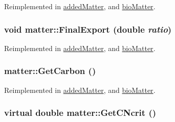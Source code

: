 Reimplemented in \hyperlink{classadded_matter_a40c4a27c09387b87f804e1c3a48cf908}{addedMatter}, and \hyperlink{classbio_matter_adbafa5aac0c673f8659adec82a4cc99f}{bioMatter}.\hypertarget{classmatter_a36bd225841eda2240009df17d239cfa1}{
\subsubsection[{FinalExport}]{\setlength{\rightskip}{0pt plus 5cm}void matter::FinalExport (double {\em ratio})}}
\label{classmatter_a36bd225841eda2240009df17d239cfa1}


Reimplemented in \hyperlink{classadded_matter_a6c6bab5a53ecb7358459d44d29681c95}{addedMatter}, and \hyperlink{classbio_matter_ae738d8197ededa18e73f8640ce52d1ab}{bioMatter}.\hypertarget{classmatter_ae85f8f64ea546c5cbe056c641304b514}{
\subsubsection[{GetCarbon}]{ matter::GetCarbon ()}}
\label{classmatter_ae85f8f64ea546c5cbe056c641304b514}


Reimplemented in \hyperlink{classadded_matter_aa0c64a25840e1a117b686bb779403147}{addedMatter}, and \hyperlink{classbio_matter_a5e053f03d4be2b04f8e5f633f4181af1}{bioMatter}.\hypertarget{classmatter_a111bf6b7c88f61e75ed50eac1fc8c3b7}{
\subsubsection[{GetCNcrit}]{\setlength{\rightskip}{0pt plus 5cm}virtual double matter::GetCNcrit ()}}
\label{classmatter_a111bf6b7c88f61e75ed50eac1fc8c3b7}


